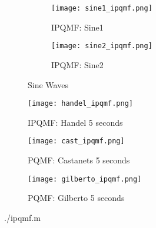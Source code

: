 \documentclass{article} %
\begin{document}
\begin{figure}[H]

\begin{subfigure}{0.5\textwidth}
\centering
\texttt{[image: sine1\_ipqmf.png]}
\caption{IPQMF: Sine1}
\label{fig:sin1IQMF}
\end{subfigure}
\begin{subfigure}{0.5\textwidth}
\centering
\texttt{[image: sine2\_ipqmf.png]}
\caption{IPQMF: Sine2}
\label{fig:sin2IQMF}
\end{subfigure}
\caption{Sine Waves}
\end{figure}
 

\begin{figure}[H]
\centering
\texttt{[image: handel\_ipqmf.png]}
\caption{IPQMF: Handel 5 seconds}
\label{fig:handIQMF}
\end{figure}

\begin{figure}[H]
\centering
\texttt{[image: cast\_ipqmf.png]}
\caption{PQMF: Castanets 5 seconds}
\label{fig:castIQMF}
\end{figure}


\begin{figure}[H]
\centering
\texttt{[image: gilberto\_ipqmf.png]}
\caption{PQMF: Gilberto 5 seconds}
\label{fig:gilbIQMF}
\end{figure}


{./ipqmf.m} 
\end{document}
